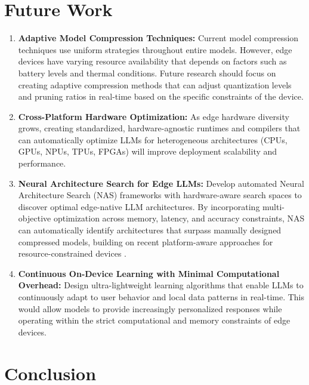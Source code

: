 \documentclass[11pt]{IEEEtran}
\begin{document}
\section{Future Work}
\begin{enumerate}
    \item \textbf{Adaptive Model Compression Techniques:} Current model compression techniques use uniform strategies throughout entire models. However, edge devices have varying resource availability that depends on factors such as battery levels and thermal conditions. Future research should focus on creating adaptive compression methods that can adjust quantization levels and pruning ratios in real-time based on the specific constraints of the device.
    \item \textbf{Cross-Platform Hardware Optimization:} As edge hardware diversity grows, creating standardized, hardware-agnostic runtimes and compilers that can automatically optimize LLMs for heterogeneous architectures (CPUs, GPUs, NPUs, TPUs, FPGAs) will improve deployment scalability and performance.
    \item \textbf{Neural Architecture Search for Edge LLMs:} Develop automated Neural Architecture Search (NAS) frameworks with hardware-aware search spaces to discover optimal edge-native LLM architectures. By incorporating multi-objective optimization across memory, latency, and accuracy constraints, NAS can automatically identify architectures that surpass manually designed compressed models, building on recent platform-aware approaches for resource-constrained devices \cite{b62}.
    \item \textbf{Continuous On-Device Learning with Minimal Computational Overhead:} Design ultra-lightweight learning algorithms that enable LLMs to continuously adapt to user behavior and local data patterns in real-time. This would allow models to provide increasingly personalized responses while operating within the strict computational and memory constraints of edge devices.
\end{enumerate}



\section{Conclusion}
\end{document}

